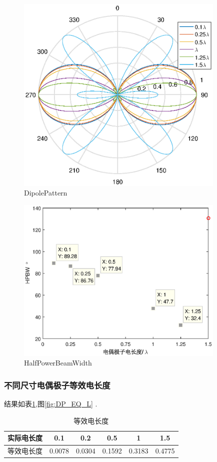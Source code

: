 \begin{figure}[hp]
\centering
\includegraphics[width=10cm]{DipolePattern.eps}
\caption{DipolePattern} \label{fig:DP}
\end{figure}

\begin{figure}[hp]
\centering
\includegraphics[width=10cm]{Dipole_3dB_beamwidth.eps}
\caption{HalfPowerBeamWidth} \label{fig:DP3dB}
\end{figure}
\subsubsection{不同尺寸电偶极子等效电长度}
结果如表\ref{tab:EQ_L},图\ref{fig:DP_EQ_L} .
\\
\begin{table}[h]
\centering
\begin{tabular}{cccccc}
\toprule
实际电长度&0.1 &0.2&0.5&1&1.5\\
\midrule
等效电长度&0.0078&0.0304&0.1592&0.3183&0.4775\\
\bottomrule
\end{tabular}
\caption{等效电长度} \label{tab:EQ_L}
\end{table}

